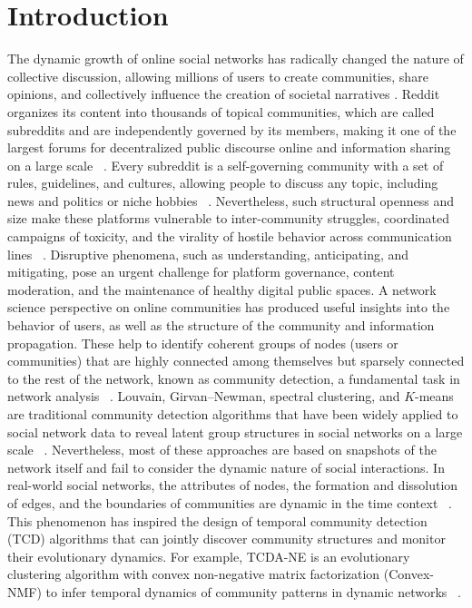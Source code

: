 \documentclass[a4paper,fleqn]{cas-dc}
\begin{document}
\maketitle


\section{Introduction}\label{introduction}


The dynamic growth of online social networks has radically changed the nature of collective discussion, allowing millions of users to create communities, share opinions, and collectively influence the creation of societal narratives \cite{7_Goglia2024, 5_Huber2022}. Reddit organizes its content into thousands of topical communities, which are called subreddits and are independently governed by its members, making it one of the largest forums for decentralized public discourse online and information sharing on a large scale ~\cite{2_Zhu2022}. Every subreddit is a self-governing community with a set of rules, guidelines, and cultures, allowing people to discuss any topic, including news and politics or niche hobbies ~\cite{7_Goglia2024}. Nevertheless, such structural openness and size make these platforms vulnerable to inter-community struggles, coordinated campaigns of toxicity, and the virality of hostile behavior across communication lines ~\cite{3_Vachher2020, 9_Gothard2020}. Disruptive phenomena, such as understanding, anticipating, and mitigating, pose an urgent challenge for platform governance, content moderation, and the maintenance of healthy digital public spaces.
A network science perspective on online communities has produced useful insights into the behavior of users, as well as the structure of the community and information propagation. These help to identify coherent groups of nodes (users or communities) that are highly connected among themselves but sparsely connected to the rest of the network, known as community detection, a fundamental task in network analysis ~\cite{6_Malode2025, 14_McAuley2012}. Louvain, Girvan–Newman, spectral clustering, and $K$-means are traditional community detection algorithms that have been widely applied to social network data to reveal latent group structures in social networks on a large scale ~\cite{6_Malode2025}. Nevertheless, most of these approaches are based on snapshots of the network itself and fail to consider the dynamic nature of social interactions. In real-world social networks, the attributes of nodes, the formation and dissolution of edges, and the boundaries of communities are dynamic in the time context ~\cite{10_yuan2025}. This phenomenon has inspired the design of temporal community detection (TCD) algorithms that can jointly discover community structures and monitor their evolutionary dynamics. For example, TCDA-NE is an evolutionary clustering algorithm with convex non-negative matrix factorization (Convex-NMF) to infer temporal dynamics of community patterns in dynamic networks ~\cite{10_yuan2025}.
\end{document}
